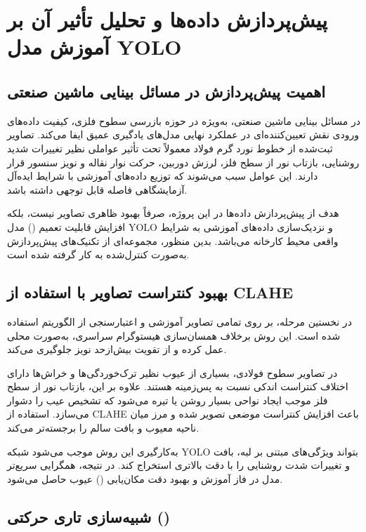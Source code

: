 \documentclass[a4paper, 10pt, twocolumn]{article}
\begin{document}
	
	
	
	\section{پیش‌پردازش داده‌ها و تحلیل تأثیر آن بر آموزش مدل YOLO}
	
	\subsection{اهمیت پیش‌پردازش در مسائل بینایی ماشین صنعتی}
	
	در مسائل بینایی ماشین صنعتی، به‌ویژه در حوزه بازرسی سطوح فلزی، کیفیت داده‌های ورودی نقش تعیین‌کننده‌ای در عملکرد نهایی مدل‌های یادگیری عمیق ایفا می‌کند. تصاویر ثبت‌شده از خطوط نورد گرم فولاد معمولاً تحت تأثیر عواملی نظیر تغییرات شدید روشنایی، بازتاب نور از سطح فلز، لرزش دوربین، حرکت نوار نقاله و نویز سنسور قرار دارند. این عوامل سبب می‌شوند که توزیع داده‌های آموزشی با شرایط ایده‌آل آزمایشگاهی فاصله قابل توجهی داشته باشد.
	
	هدف از پیش‌پردازش داده‌ها در این پروژه، صرفاً بهبود ظاهری تصاویر نیست، بلکه افزایش قابلیت تعمیم () مدل YOLO و نزدیک‌سازی داده‌های آموزشی به شرایط واقعی محیط کارخانه می‌باشد. بدین منظور، مجموعه‌ای از تکنیک‌های پیش‌پردازش به‌صورت کنترل‌شده به کار گرفته شده است.
	
	\subsection{بهبود کنتراست تصاویر با استفاده از CLAHE}
	
	در نخستین مرحله، بر روی تمامی تصاویر آموزشی و اعتبارسنجی از الگوریتم  استفاده شده است. این روش برخلاف همسان‌سازی هیستوگرام سراسری، به‌صورت محلی عمل کرده و از تقویت بیش‌ازحد نویز جلوگیری می‌کند.
	
	در تصاویر سطوح فولادی، بسیاری از عیوب نظیر ترک‌خوردگی‌ها و خراش‌ها دارای اختلاف کنتراست اندکی نسبت به پس‌زمینه هستند. علاوه بر این، بازتاب نور از سطح فلز موجب ایجاد نواحی بسیار روشن یا تیره می‌شود که تشخیص عیب را دشوار می‌سازد. استفاده از CLAHE باعث افزایش کنتراست موضعی تصویر شده و مرز میان ناحیه معیوب و بافت سالم را برجسته‌تر می‌کند.
	
	به‌کارگیری این روش موجب می‌شود شبکه YOLO بتواند ویژگی‌های مبتنی بر لبه، بافت و تغییرات شدت روشنایی را با دقت بالاتری استخراج کند. در نتیجه، همگرایی سریع‌تر مدل در فاز آموزش و بهبود دقت مکان‌یابی () عیوب حاصل می‌شود.
	
	\subsection{شبیه‌سازی تاری حرکتی ()}
	
\end{document}
